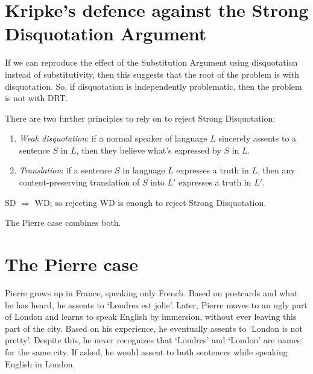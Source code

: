 \section{Kripke's defence against the Strong Disquotation Argument}

If we can reproduce the effect of the Substitution Argument using disquotation instead of substitutivity, then this suggests that the root of the problem is with disquotation. So, if disquotation is independently problematic, then the problem is not with DRT.

There are two further principles to rely on to reject Strong Disquotation:

\begin{definition}\leavevmode
\begin{enumerate}[label=\roman*.]
  \item \emph{Weak disquotation}: if a normal speaker of language $L$ sincerely assents to a sentence $S$ in $L$, then they believe what's expressed by $S$ in $L$.
  \item \emph{Translation}: if a sentence $S$ in language $L$ expresses a truth in $L$, then any content-preserving translation of $S$ into $L'$ expresses a truth in $L'$.
\end{enumerate}
\end{definition}

\begin{note}
SD $\Rightarrow$ WD; so rejecting WD is enough to reject Strong Disquotation.
\end{note}

The Pierre case combines both.

\section{The Pierre case}

\begin{example}[Setup]
Pierre grows up in France, speaking only French. Based on postcards and what he has heard, he assents to `Londres est jolie'. Later, Pierre moves to an ugly part of London and learns to speak English by immersion, without ever leaving this part of the city. Based on his experience, he eventually assents to `London is not pretty'. Despite this, he never recognizes that `Londres' and `London' are names for the same city. If asked, he would assent to both sentences while speaking English in London.
\end{example}

